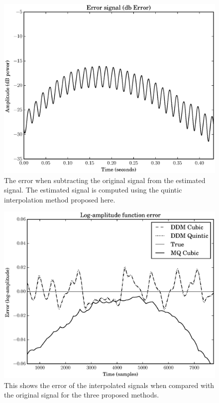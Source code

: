 \begin{figure}[!t]
    \includegraphics[width=\textwidth]{plots/mq_mod_quintic_error.eps}
    \caption{The error when subtracting the original signal from the estimated
        signal. The estimated signal is computed using the quintic interpolation
        method proposed here.
    \label{plot:mqmodcubicerror}}
\end{figure}

\begin{figure}[!t]
    \includegraphics[width=\textwidth]{plots/mq_mod_err_comp_logamp_err.eps}
    \caption{This shows the error of the interpolated signals when compared
    with the original signal for the three proposed methods.
    \label{plot:mqmoderrcomplogamperr}}
\end{figure}

